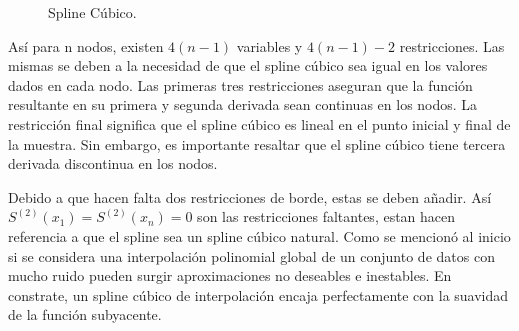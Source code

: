 \begin{figure}[h]
\caption{Spline C\'ubico.}
\label{spline_3}
\end{figure}



\hspace{0.4cm}As\'i para n nodos, existen $4(n-1)$ variables y $4(n-1)-2$ restricciones. Las mismas se deben a la necesidad de que el spline c\'ubico sea igual en los valores dados en cada nodo. Las primeras tres restricciones aseguran que la funci\'on resultante en su primera y segunda derivada sean continuas en los nodos. La restricci\'on final significa que el spline c\'ubico es lineal en el punto inicial y final de la muestra. Sin embargo, es importante resaltar que el spline c\'ubico tiene tercera derivada discontinua en los nodos.

\hspace{0.4cm}Debido a que hacen falta dos restricciones de borde, estas se deben a\~nadir. As\'i  $S^{(2)}(x_{1}) = S^{(2)}(x_{n}) = 0$ son las restricciones faltantes, estan hacen referencia a que el spline sea un spline c\'ubico natural. Como se mencion\'o al inicio si se considera una interpolaci\'on polinomial global de un conjunto de datos con mucho ruido pueden surgir aproximaciones no deseables e inestables. En constrate, un spline c\'ubico de interpolaci\'on encaja perfectamente con la suavidad de la funci\'on subyacente.

